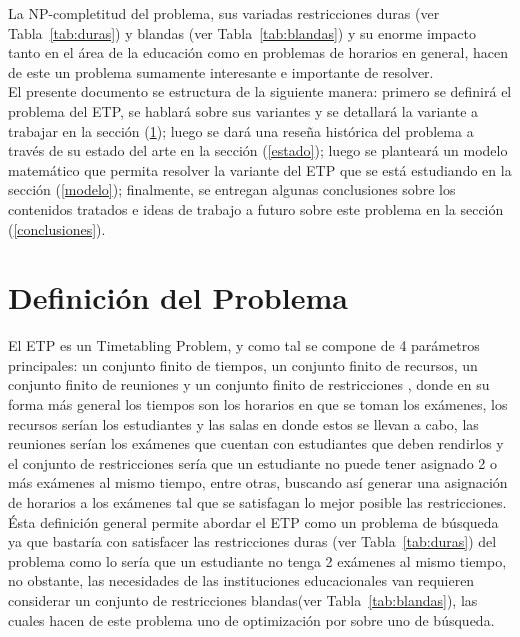 \documentclass[letter, 10pt]{article}
\begin{document}
La NP-completitud del problema, sus variadas restricciones duras (ver Tabla~\ref{tab:duras}) y blandas (ver Tabla~\ref{tab:blandas}) y su enorme impacto tanto en el área de la educación como en problemas de horarios en general, hacen de este un problema sumamente interesante e importante de resolver.\\ 

El presente documento se estructura de la siguiente manera: primero se definirá el problema del ETP, se hablará sobre sus variantes y se detallará la variante a trabajar en la sección (\ref{definicion}); luego se dará una reseña histórica del problema a través de su estado del arte en la sección (\ref{estado}); luego se planteará un modelo matemático que permita resolver la variante del ETP que se está estudiando en la sección (\ref{modelo}); finalmente, se entregan algunas conclusiones sobre los contenidos tratados e ideas de trabajo a futuro sobre este problema en la sección (\ref{conclusiones}).

\section{Definición del Problema} \label{definicion}

El ETP es un Timetabling Problem, y como tal se compone de 4 parámetros principales: un conjunto finito de tiempos, un conjunto finito de recursos, un conjunto finito de reuniones y un conjunto finito de restricciones \cite{Qu2009}, donde en su forma más general los tiempos son los horarios en que se toman los exámenes, los recursos serían los estudiantes y las salas en donde estos se llevan a cabo, las reuniones serían los exámenes que cuentan con estudiantes que deben rendirlos y el conjunto de restricciones sería que un estudiante no puede tener asignado 2 o más exámenes al mismo tiempo, entre otras, buscando así generar una asignación de horarios a los exámenes tal que se satisfagan lo mejor posible las restricciones. Ésta definición general permite abordar el ETP como un problema de búsqueda ya que bastaría con satisfacer las restricciones duras (ver Tabla~\ref{tab:duras}) del problema como lo sería que un estudiante no tenga 2 exámenes al mismo tiempo, no obstante, las necesidades de las instituciones educacionales van requieren considerar un conjunto de restricciones blandas(ver Tabla~\ref{tab:blandas}), las cuales hacen de este problema uno de optimización por sobre uno de búsqueda.\\
\end{document}
